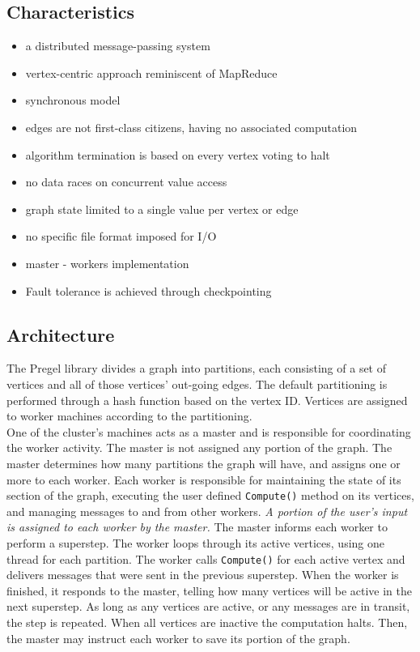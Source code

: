 \documentclass[letterpaper,twocolumn,10pt]{article}
\begin{document}
\subsection{Characteristics}
\begin{itemize}
\item a distributed message-passing system
\item vertex-centric approach reminiscent of MapReduce
\item synchronous model
\item edges are not first-class citizens, having no associated computation
\item algorithm termination is based on every vertex voting to halt
\item no data races on concurrent value access
\item graph state limited to a single value per vertex or edge
\item no specific file format imposed for I/O
\item master - workers implementation
\item Fault tolerance is achieved through checkpointing
\end{itemize}

\subsection{Architecture}
The Pregel library divides a graph into partitions, each consisting of a set of vertices and all of those vertices' out-going edges. The default partitioning is performed through a hash function based on the vertex ID. Vertices are assigned to worker machines according to the partitioning.\\

One of the cluster's machines acts as a master and is responsible for coordinating the worker activity. The master is not assigned any portion of the graph.
The master determines how many partitions the graph will have, and assigns one or more to each worker. 
Each worker is responsible for maintaining the state of its section of the graph, executing the user defined {\tt Compute()} method on its vertices, and managing messages to and from other workers.
\textit{A portion of the user's input is assigned to each worker by the master.}
The master informs each worker to perform a superstep. The worker loops through its active vertices, using one thread for each partition. The worker calls {\tt Compute()} for each active vertex and delivers messages that were sent in the previous superstep.
When the worker is finished, it responds to the master, telling how many vertices will be active in the next superstep. As long as any vertices are active, or any messages are in transit, the step is repeated.
When all vertices are inactive the computation halts. Then, the master may instruct each worker to save its portion of the graph.
\end{document}
